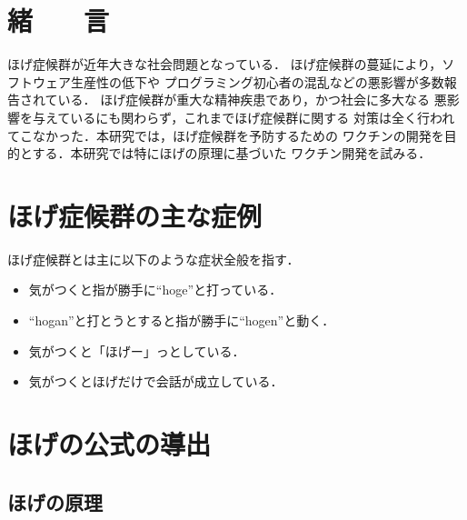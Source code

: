 


\newcommand{\FIGDIR}{./fig}	%
\usepackage{pxjahyper} %
\usepackage{ikuo}%


\begin{small}
\section{緒　　言}
ほげ症候群が近年大きな社会問題となっている\cite{Kawamura:hogege2010}．
ほげ症候群の蔓延により，ソフトウェア生産性の低下や
プログラミング初心者の混乱などの悪影響が多数報告されている．
ほげ症候群が重大な精神疾患であり，かつ社会に多大なる
悪影響を与えているにも関わらず，これまでほげ症候群に関する
対策は全く行われてこなかった．本研究では，ほげ症候群を予防するための
ワクチンの開発を目的とする．本研究では特にほげの原理に基づいた
ワクチン開発を試みる．
\section{ほげ症候群の主な症例}
ほげ症候群とは主に以下のような症状全般を指す\cite{hooogeBook}．
\begin{itemize}
\item 気がつくと指が勝手に``hoge''と打っている．
\item ``hogan''と打とうとすると指が勝手に``hogen''と動く．
\item 気がつくと「ほげー」っとしている．
\item 気がつくとほげだけで会話が成立している．
\end{itemize}

\section{ほげの公式の導出}
\subsection{ほげの原理}


\end{small}
